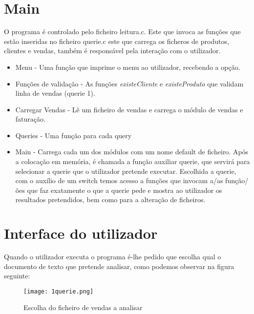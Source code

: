 \chapter{Main}

O programa é controlado pelo ficheiro leitura.c. Este que invoca as funções que estão inseridas no ficheiro querie.c este que carrega os ficheros de produtos, clientes e vendas, também é responsável pela interação com o utilizador.

\begin{itemize}
	
\item Menu -  Uma função que imprime o menu ao utilizador, recebendo a opção.
	
\item Funções de validação -  As funções \emph{existeCliente} e \emph{existeProduto} que validam  linha de vendas (querie 1).
	
\item Carregar Vendas - Lê um ficheiro de vendas e carrega o módulo de vendas e faturação.
	
\item Queries - Uma função para cada query
	
\item Main - Carrega cada um dos módulos com um nome default de ficheiro. Após a colocação em memória, é chamada a função auxiliar querie, que servirá para selecionar a querie que o utilizador pretende executar. Escolhida a querie, com o auxílio de um switch temos acesso a funções que invocam a/as função/ões que faz exatamente o que a querie pede e mostra ao utilizador os resultados pretendidos, bem como para a alteração de ficheiros.
	
\end{itemize}

  

\chapter{Interface do utilizador}

Quando o utilizador executa o programa é-lhe pedido que escolha qual o documento de texto que pretende analisar, como podemos observar na figura seguinte: 

\begin{figure}[h!]
	\centering
	\texttt{[image: 1querie.png]}  
	\caption{Escolha do ficheiro de vendas a analisar}  
\end{figure}

